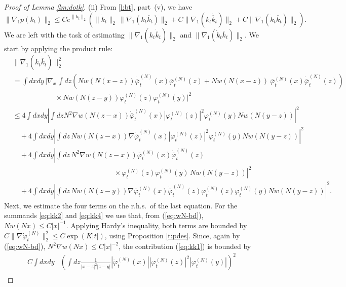 \documentclass[11pt,a4paper]{article}
\newcommand{\di}{{d}}		%
\newcommand{\cc}[1]{\overline{#1}}	%
\newcommand{\norm}[1]{\lVert#1\rVert}	%
\newcommand{\ph}{\varphi_t^{(N)}}	%
\newcommand{\phdot}{\dot{\varphi}_t^{(N)}}	%
\begin{document}
\begin{proof}[Proof of Lemma \ref{lm:dotk}]
(ii) {F}rom \ref{l:bt}, part~(v), we have
\[\| \nabla_1 \dot p (k_t) \|_2 \leq C e^{\| k_t \|_2} \left( \| \dot k_t
\|_2 \,  \| \nabla_1 (k_t \overline{k}_t) \|_2 + C \| \nabla_1 (k_t
\dot{\overline{k}}_t) \|_2  + C \| \nabla_1 (\dot k_t \overline{k}_t) \|_2
\right). \]
We are left with the task of estimating $\| \nabla_1 (k_t \dot{\overline{k}}_t) \|_2$ and $\| \nabla_1 (\dot k_t \overline{k}_t) \|_2$. We start by applying the product rule:
\begin{align}
& \norm{\nabla_1 (k_t \dot{\overline{k}}_t)}_2^2  \nonumber \\
& = \int \di x \di y \, \bigg\lvert \nabla_x \, \int dz \left( N w(N(x-z)) \dot{\cc{\varphi}}_t^{(N)} (x) \cc{\varphi}_t^{(N)} (z) + N w(N(x-z))\ \cc{\varphi}_t^{(N)} (x) \dot{\cc{\varphi}}_t^{(N)} (z) \right) \nonumber \\
& \qquad\qquad\qquad \times N w(N(z-y)) {\ph(z)} {\ph(y)} \bigg\rvert^2 \nonumber \\
& \leq 4 \int \di x \di y \left\lvert \int dz N^2 \nabla w (N(z-x)) \dot{\cc{\varphi}}_t^{(N)} (x)  |\ph(z)|^2  \ph(y) N w (N(y-z)) \right|^2 \label{eq:kk1} \\
& \quad + 4 \int \di x \di y \left| \int dz \, N w (N(z-x)) \nabla \dot{\cc{\varphi}}_t^{(N)} (x) |\ph(z)|^2 \ph(y) N w (N(y-z)) \right|^2 \label{eq:kk2}\\
& \quad + 4 \int \di x \di y \left| \int dz \, N^2 \nabla w (N(z-x)) \cc{\varphi}_t^{(N)} (x) \dot{\cc{\varphi}}_t^{(N)} (z) \right. \nonumber \\ & \left. \hspace{6cm} \times \ph(z)  \ph(y) \, N w (N(y-z)) \right|^2 \label{eq:kk3}\\
& \quad + 4 \int \di x \di y \left| \int dz \, N w(N(z-y)) \nabla \cc{\varphi}_t^{(N)} (x) \dot{\cc{\varphi}}_t^{(N)} (z) \ph(z) \ph(y) N w(N(y-z)) \right|^2. \label{eq:kk4}
\end{align}
Next, we estimate the four terms on the r.h.s.\ of the last equation. For the summands \eqref{eq:kk2} and \eqref{eq:kk4} we use that, from (\ref{eq:wN-bd}), $N w(Nx) \leq C |x|^{-1}$. Applying Hardy's inequality, both terms are bounded by $C \norm{\nabla \phdot}_{2}^2 \leq C \exp (K |t|)$, using Proposition \ref{t:pdes}. Since, again by (\ref{eq:wN-bd}), $N^2 \nabla w (Nx)\leq C |x|^{-2}$, the contribution (\ref{eq:kk1}) is bounded by 
\begin{align*}
C \int \di x \di y &\left( \int \di z \frac{1}{|x-z|^2 |z-y|} |\dot{\varphi}_t^{(N)} (x)| |\ph(z)|^2 |\ph(y)|  \right)^2 \\

\end{align*}
\end{proof}
\end{document}
